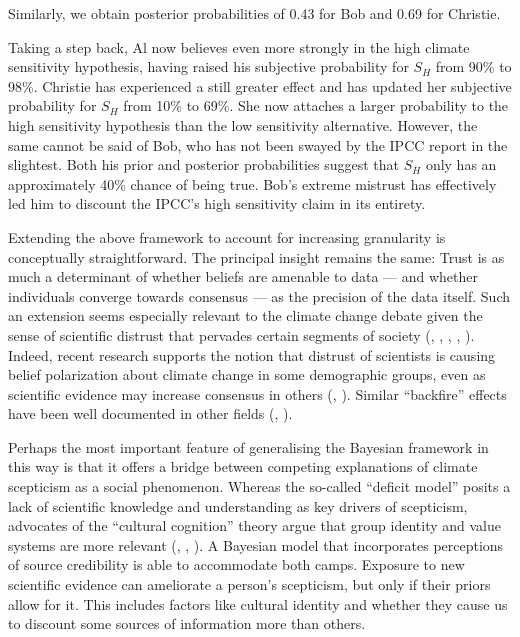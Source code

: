 \documentclass[smallextended]{svjour3}       %
\begin{document}
Similarly, we obtain posterior probabilities of 0.43 for Bob and 0.69
for Christie.

Taking a step back, Al now believes even more strongly in the high
climate sensitivity hypothesis, having raised his subjective probability
for \(S_H\) from 90\% to 98\%. Christie has experienced a still greater
effect and has updated her subjective probability for \(S_H\) from 10\%
to 69\%. She now attaches a larger probability to the high sensitivity
hypothesis than the low sensitivity alternative. However, the same
cannot be said of Bob, who has not been swayed by the IPCC report in the
slightest. Both his prior and posterior probabilities suggest that
\(S_H\) only has an approximately 40\% chance of being true. Bob's
extreme mistrust has effectively led him to discount the IPCC's high
sensitivity claim in its entirety.

Extending the above framework to account for increasing granularity is
conceptually straightforward. The principal insight remains the same:
Trust is as much a determinant of whether beliefs are amenable to data
--- and whether individuals converge towards consensus --- as the
precision of the data itself. Such an extension seems especially
relevant to the climate change debate given the sense of scientific
distrust that pervades certain segments of society
(\cite{malka2009association}, \cite{gauchat2012politicization},
\cite{leiserowitz2013climategate}, \cite{fiske2014gaining},
\cite{hmielowski2014attack}). Indeed, recent research supports the
notion that distrust of scientists is causing belief polarization about
climate change in some demographic groups, even as scientific evidence
may increase consensus in others (\cite{cook2016rational},
\cite{zhou2016boomerangs}). Similar ``backfire'' effects have been well
documented in other fields (\cite{nyhan2010backfire},
\cite{harris2015bayesian}).

Perhaps the most important feature of generalising the Bayesian
framework in this way is that it offers a bridge between competing
explanations of climate scepticism as a social phenomenon. Whereas the
so-called ``deficit model'' posits a lack of scientific knowledge and
understanding as key drivers of scepticism, advocates of the ``cultural
cognition'' theory argue that group identity and value systems are more
relevant (\cite{kahan2011cultural}, \cite{kahan2012polarizing},
\cite{ranney2016climate}). A Bayesian model that incorporates
perceptions of source credibility is able to accommodate both camps.
Exposure to new scientific evidence can ameliorate a person's
scepticism, but only if their priors allow for it. This includes factors
like cultural identity and whether they cause us to discount some
sources of information more than others.
\end{document}
